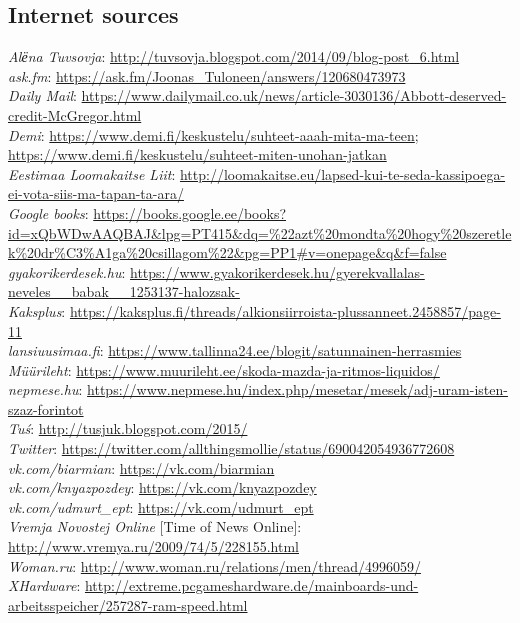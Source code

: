\documentclass[output=paper,colorlinks,citecolor=brown]{langscibook}
\begin{document}
\subsection*{Internet sources}

\textit{Alёna Tuvsovja}: \url{http://tuvsovja.blogspot.com/2014/09/blog-post_6.html}\\
\textit{ask.fm}: \url{https://ask.fm/Joonas_Tuloneen/answers/120680473973}\\
\textit{Daily Mail}: \url{https://www.dailymail.co.uk/news/article-3030136/Abbott-deserved-credit-McGregor.html}\\
\textit{Demi}: \url{https://www.demi.fi/keskustelu/suhteet-aaah-mita-ma-teen}; \url{https://www.demi.fi/keskustelu/suhteet-miten-unohan-jatkan}\\
\textit{Eestimaa Loomakaitse Liit}: \url{http://loomakaitse.eu/lapsed-kui-te-seda-kassipoega-ei-vota-siis-ma-tapan-ta-ara/}\\
\textit{Google books}: \url{https://books.google.ee/books?id=xQbWDwAAQBAJ&lpg=PT415&dq=%22azt%20mondta%20hogy%20szeretlek%20dr%C3%A1ga%20csillagom%22&pg=PP1#v=onepage&q&f=false}\\
\textit{gyakorikerdesek.hu}: \url{https://www.gyakorikerdesek.hu/gyerekvallalas-neveles__babak__1253137-halozsak-}\\
\textit{Kaksplus}: \url{https://kaksplus.fi/threads/alkionsiirroista-plussanneet.2458857/page-11}\\
\textit{lansiuusimaa.fi}: \url{https://www.tallinna24.ee/blogit/satunnainen-herrasmies}\\
\textit{Müürileht}: \url{https://www.muurileht.ee/skoda-mazda-ja-ritmos-liquidos/}\\
\textit{nepmese.hu}: \url{https://www.nepmese.hu/index.php/mesetar/mesek/adj-uram-isten-szaz-forintot}\\
\textit{Tuś}: \url{http://tusjuk.blogspot.com/2015/}\\
\textit{Twitter}: \url{https://twitter.com/allthingsmollie/status/690042054936772608}\\
\textit{vk.com/biarmian}: \url{https://vk.com/biarmian}\\
\textit{vk.com/knyazpozdey}: \url{https://vk.com/knyazpozdey}\\
\textit{vk.com/udmurt\_ept}: \url{https://vk.com/udmurt_ept}\\
\textit{Vremja Novostej Online} [Time of News Online]: \url{http://www.vremya.ru/2009/74/5/228155.html}\\
\textit{Woman.ru}: \url{http://www.woman.ru/relations/men/thread/4996059/}\\
\textit{XHardware}: \url{http://extreme.pcgameshardware.de/mainboards-und-arbeitsspeicher/257287-ram-speed.html}

\sloppy\printbibliography[heading=subbibliography,notkeyword=this]
\end{document}
